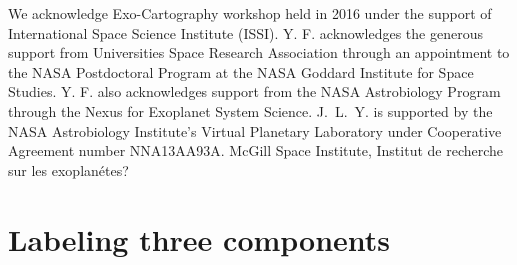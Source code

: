 \documentclass[iop,numberedappendix,apj,]{emulateapj}
\begin{document}
\acknowledgements

We acknowledge Exo-Cartography workshop held in 2016 under the support of International Space Science Institute (ISSI). 
Y. F. acknowledges the generous support from Universities Space Research Association through an appointment to the NASA Postdoctoral Program at the NASA Goddard Institute for Space Studies. 
Y. F. also acknowledges support from the NASA Astrobiology Program through the Nexus for Exoplanet System Science. 
J.~L.~Y. is supported by the NASA Astrobiology Institute's Virtual Planetary Laboratory under Cooperative Agreement number NNA13AA93A. 
McGill Space Institute, Institut de recherche sur les exoplan\'etes? 

\newpage



\newpage

\appendix

\newpage

\section{Labeling three components}
\end{document}
